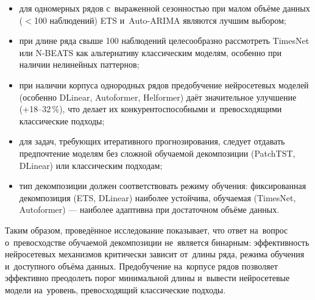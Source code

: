 \begin{itemize}[nosep]
\item для одномерных рядов с~выраженной сезонностью при малом объёме
  данных ($<$100 наблюдений) ETS и~Auto-ARIMA являются лучшим
  выбором;
\item при длине ряда свыше 100 наблюдений целесообразно рассмотреть
  TimesNet или N-BEATS как альтернативу классическим моделям,
  особенно при наличии нелинейных паттернов;
\item при наличии корпуса однородных рядов предобучение нейросетевых
  моделей (особенно DLinear, Autoformer, Helformer) даёт
  значительное улучшение (+18--32\,\%), что делает их
  конкурентоспособными и~превосходящими классические подходы;
\item для задач, требующих итеративного прогнозирования, следует
  отдавать предпочтение моделям без сложной обучаемой декомпозиции
  (PatchTST, DLinear) или классическим подходам;
\item тип декомпозиции должен соответствовать режиму обучения:
  фиксированная декомпозиция (ETS, DLinear) наиболее устойчива,
  обучаемая (TimesNet, Autoformer) --- наиболее адаптивна при
  достаточном объёме данных.
\end{itemize}

Таким образом, проведённое исследование показывает, что ответ
на~вопрос о~превосходстве обучаемой декомпозиции не~является
бинарным: эффективность нейросетевых механизмов критически зависит
от~длины ряда, режима обучения и~доступного объёма данных.
Предобучение на~корпусе рядов позволяет эффективно преодолеть
порог минимальной длины и~вывести нейросетевые модели на~уровень,
превосходящий классические подходы.
